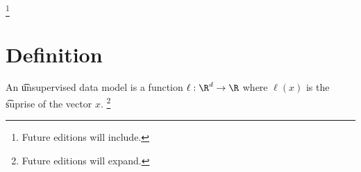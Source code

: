 
  \ifhmode\unskip\fi\footnote{
Future editions will include.
  }

\section{Definition}

An \t{unsupervised data model} is a function $\ell: \R^d \to \R$ where $\ell(x)$ is the \t{suprise} of the vector $x$.
  \ifhmode\unskip\fi\footnote{
Future editions will expand.
  }


\blankpage

